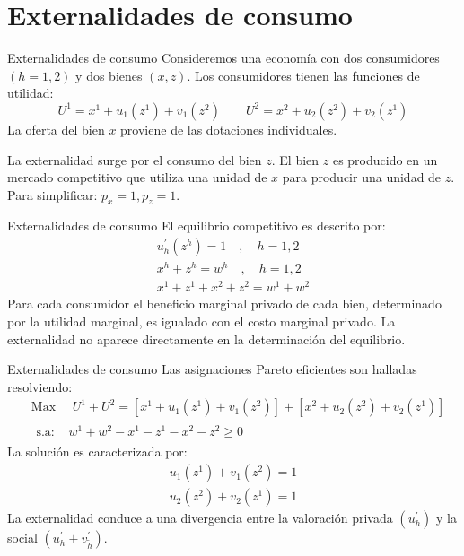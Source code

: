 \section[Consumo]{Externalidades de consumo}

\begin{frame}{Externalidades de consumo}
Consideremos una economía con dos consumidores $(h=1,2)$ y dos bienes $(x,z)$. Los consumidores tienen las funciones de utilidad:
	$$U^1 = x^1 + u_1(z^1) + v_1(z^2) \qquad U^2 = x^2 + u_2(z^2) + v_2(z^1)$$
\medskip
La oferta del bien $x$ proviene de las dotaciones individuales.\medskip

La externalidad surge por el consumo del bien $z$. El bien $z$ es producido en un mercado competitivo que utiliza una unidad de $x$ para producir una unidad de $z$.
Para simplificar: $p_x=1, p_z=1$.
\end{frame}
\begin{frame}{Externalidades de consumo}
El equilibrio competitivo es descrito por:
	\begin{gather*}
		u_{h}^{\prime}\left( z^h\right) = 1 \quad , \quad h = 1, 2\\
		x^h +z^h = w ^h \quad , \quad h = 1, 2\\
		x^1 + z^1 + x^2 + z^2 = w^1 + w^2
	\end{gather*}
Para cada consumidor el beneficio marginal privado de cada bien, determinado por la utilidad marginal, es igualado con el costo marginal privado. La externalidad no aparece directamente en la determinación del equilibrio.
\end{frame}
\begin{frame}{Externalidades de consumo}
Las asignaciones Pareto eficientes son halladas resolviendo:
		\begin{align*}
			& \text{Max } \quad U^1 + U^2 = \left[ x^1 + u_1\left(z^1 \right) + v_1\left(z^2 \right) \right] + \left[ x^2 + u_2\left(z^2 \right) + v_2\left(z^1 \right) \right]\\
			& \begin{array}{ll}
				\text{s.a: } & w^1 + w^2 - x^1 - z^1 - x^2 - z^2 \geq 0
			\end{array}
		\end{align*}
La solución es caracterizada por:
	\begin{gather*}
		u_1\left(z^1 \right) + v_1\left(z^2 \right) = 1\\
		u_2\left(z^2 \right) + v_2\left(z^1 \right) = 1
	\end{gather*}
La externalidad conduce a una divergencia entre la valoración privada $(u_{h}^{\prime})$ y la social $(u_{h}^{\prime} + v_{\tilde{h}}^{\prime})$.
\end{frame}
